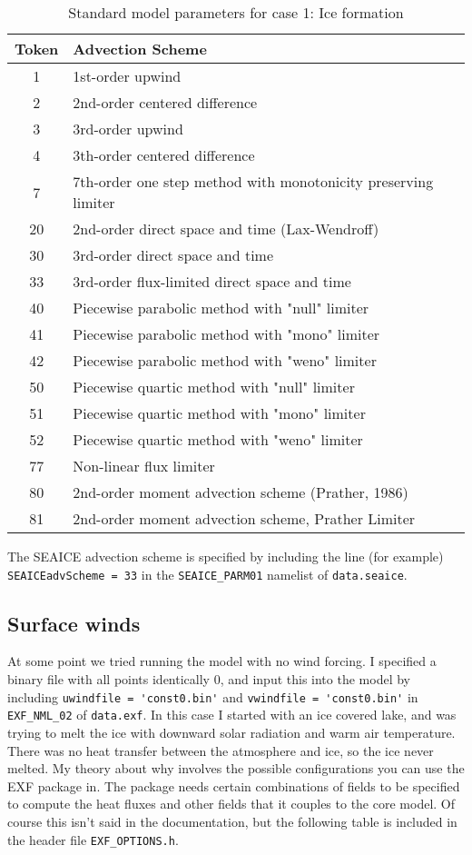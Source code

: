 \documentclass[11pt]{article}
\begin{document}
\begin{table}[h!]
\begin{tabularx}{\textwidth}{ |c|X| }
\hline
Token  &  Advection Scheme \\ \hline
  1   & 1st-order upwind \\
  2   & 2nd-order centered difference \\
  3   & 3rd-order upwind \\
  4   & 3th-order centered difference \\
  7   & 7th-order one step method with monotonicity preserving limiter \\
  20  & 2nd-order direct space and time (Lax-Wendroff) \\
  30  & 3rd-order direct space and time \\
  33  & 3rd-order flux-limited direct space and time \\
  40  & Piecewise parabolic method with "null" limiter \\
  41  & Piecewise parabolic method with "mono" limiter \\
  42  & Piecewise parabolic method with "weno" limiter \\
  50  & Piecewise quartic method with "null" limiter \\
  51  & Piecewise quartic method with "mono" limiter \\
  52  & Piecewise quartic method with "weno" limiter \\
  77  & Non-linear flux limiter \\
  80  & 2nd-order moment advection scheme (Prather, 1986) \\
  81  & 2nd-order moment advection scheme, Prather Limiter \\ \hline
\end{tabularx}
\caption{Standard model parameters for case 1: Ice formation}
\label{table:advectionSchemes}
\end{table}

The SEAICE advection scheme is specified by including the line (for example) \verb|SEAICEadvScheme = 33| in the \verb|SEAICE_PARM01| namelist of \verb|data.seaice|.

\subsection{Surface winds}
\label{sec:epsilonWinds}
At some point we tried running the model with no wind forcing. I specified a binary file with all points identically 0, and input this into the model by including \verb|uwindfile = 'const0.bin'| and \verb|vwindfile = 'const0.bin'| in \verb|EXF_NML_02| of \verb|data.exf|. In this case I started with an ice covered lake, and was trying to melt the ice with downward solar radiation and warm air temperature. There was no heat transfer between the atmosphere and ice, so the ice never melted. My theory about why involves the possible configurations you can use the EXF package in. The package needs certain combinations of fields to be specified to compute the heat fluxes and other fields that it couples to the core model. Of course this isn't said in the documentation, but the following table is included in the header file \verb|EXF_OPTIONS.h|.
\end{document}
